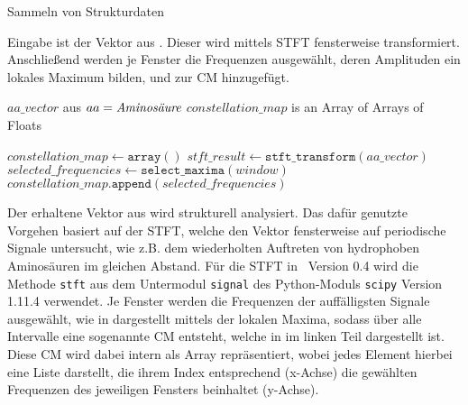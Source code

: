         \begin{algorithm}[H]
            \caption{Sammeln von Strukturdaten}\label{alg:strukturdaten}
            Eingabe ist der Vektor aus . Dieser wird mittels \acs{STFT} fensterweise transformiert. Anschließend werden je Fenster die Frequenzen ausgewählt, deren Amplituden ein lokales Maximum bilden, und zur \acl{CM} hinzugefügt.
            \begin{algorithmic}[1]
                \Require $aa\_vector$ aus  \Comment $aa = \emph{Aminosäure}$
                \Ensure $constellation\_map$ is an Array of Arrays of Floats

                \State $constellation\_map \gets \texttt{array}()$
                \State $stft\_result \gets \texttt{stft\_transform}(aa\_vector)$
                    \State $selected\_frequencies \gets \texttt{select\_maxima}(window)$
                    \State $constellation\_map.\texttt{append}(selected\_frequencies)$
                \EndFor
            \end{algorithmic}
        \end{algorithm}
        Der erhaltene Vektor aus  wird strukturell analysiert. Das dafür genutzte Vorgehen basiert auf der \ac{STFT}, welche den Vektor fensterweise auf periodische Signale untersucht, wie z.B. dem wiederholten Auftreten von hydrophoben Aminosäuren im gleichen Abstand. Für die \ac{STFT} in \protfin\ Version 0.4 wird die Methode \texttt{stft} aus dem Untermodul \texttt{signal} des Python-Moduls \texttt{scipy} \autocite{scipy} Version 1.11.4 verwendet. Je Fenster werden die Frequenzen der auffälligsten Signale ausgewählt, wie in  dargestellt mittels der lokalen Maxima, sodass über alle Intervalle eine sogenannte \ac{CM} entsteht, welche in  im linken Teil dargestellt ist.
        Diese \ac{CM} wird dabei intern als Array repräsentiert, wobei jedes Element hierbei eine Liste darstellt, die ihrem Index entsprechend (x-Achse) die gewählten Frequenzen des jeweiligen Fensters beinhaltet (y-Achse).

